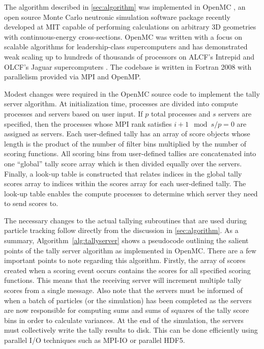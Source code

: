 \documentclass[3p,fleqn]{elsarticle}
\begin{document}
The algorithm described in \autoref{sec:algorithm} was implemented in OpenMC
\cite{ane-romano-2013}, an open source Monte Carlo neutronic simulation software
package recently developed at MIT capable of performing calculations on
arbitrary 3D geometries with continuous-energy cross-sections. OpenMC was
written with a focus on scalable algorithms for leadership-class supercomputers
and has demonstrated weak scaling up to hundreds of thousands of processors on
ALCF's Intrepid and OLCF's Jaguar supercomputers \cite{ane-romano-2013}. The
codebase is written in Fortran 2008 with parallelism provided via MPI and
OpenMP.

Modest changes were required in the OpenMC source code to implement the tally
server algorithm. At initialization time, processes are divided into compute
processes and servers based on user input. If $p$ total processes and $s$
servers are specified, then the processes whose MPI rank satisfies $i + 1 \mod
s/p = 0$ are assigned as servers. Each user-defined tally has an array of score
objects whose length is the product of the number of filter bins multiplied by
the number of scoring functions. All scoring bins from user-defined tallies are
concatenated into one ``global'' tally score array which is then divided equally
over the servers. Finally, a look-up table is constructed that relates indices
in the global tally scores array to indices within the scores array for each
user-defined tally. The look-up table enables the compute processes to determine
which server they need to send scores to.

The necessary changes to the actual tallying subroutines that are used during
particle tracking follow directly from the discussion in
\autoref{sec:algorithm}. As a summary, Algorithm~\ref{alg:tallyserver} shows a
pseudocode outlining the salient points of the tally server algorithm as
implemented in OpenMC. There are a few important points to note regarding this
algorithm. Firstly, the array of scores created when a scoring event occurs
contains the scores for all specified scoring functions. This means that the
receiving server will increment multiple tally scores from a single
message. Also note that the servers must be informed of when a batch of
particles (or the simulation) has been completed as the servers are now
responsible for computing sums and sums of squares of the tally score bins in
order to calculate variances. At the end of the simulation, the servers must
collectively write the tally results to disk. This can be done efficiently using
parallel I/O techniques such as MPI-IO or parallel HDF5.
\end{document}
